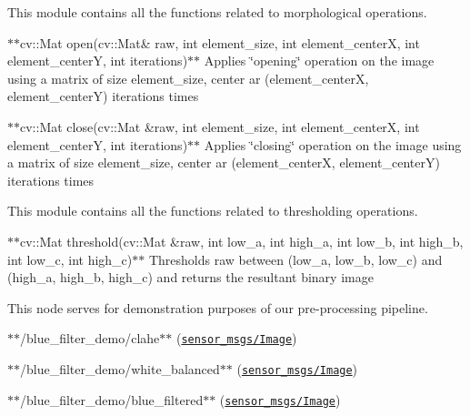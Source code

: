 This module contains all the functions related to morphological operations.


\begin{DoxyItemize}
\item $\ast$$\ast${\ttfamily cv\+::\+Mat open(cv\+::\+Mat\& raw, int element\+\_\+size, int element\+\_\+center\+X, int element\+\_\+center\+Y, int iterations)}$\ast$$\ast$ Applies \char`\"{}opening\char`\"{} operation on the image using a matrix of size {\ttfamily element\+\_\+size}, center ar ({\ttfamily element\+\_\+centerX}, {\ttfamily element\+\_\+centerY}) {\ttfamily iterations} times
\item $\ast$$\ast${\ttfamily cv\+::\+Mat close(cv\+::\+Mat \&raw, int element\+\_\+size, int element\+\_\+center\+X, int element\+\_\+center\+Y, int iterations)}$\ast$$\ast$ Applies \char`\"{}closing\char`\"{} operation on the image using a matrix of size {\ttfamily element\+\_\+size}, center ar ({\ttfamily element\+\_\+centerX}, {\ttfamily element\+\_\+centerY}) {\ttfamily iterations} times
\end{DoxyItemize}

This module contains all the functions related to thresholding operations.


\begin{DoxyItemize}
\item $\ast$$\ast${\ttfamily cv\+::\+Mat threshold(cv\+::\+Mat \&raw, int low\+\_\+a, int high\+\_\+a, int low\+\_\+b, int high\+\_\+b, int low\+\_\+c, int high\+\_\+c)}$\ast$$\ast$ Thresholds {\ttfamily raw} between ({\ttfamily low\+\_\+a}, {\ttfamily low\+\_\+b}, {\ttfamily low\+\_\+c}) and ({\ttfamily high\+\_\+a}, {\ttfamily high\+\_\+b}, {\ttfamily high\+\_\+c}) and returns the resultant binary image
\end{DoxyItemize}

This node serves for demonstration purposes of our pre-\/processing pipeline.


\begin{DoxyItemize}
\item $\ast$$\ast${\ttfamily /blue\+\_\+filter\+\_\+demo/clahe}$\ast$$\ast$ (\href{http://docs.ros.org/api/sensor_msgs/html/msg/Image.html}{\tt sensor\+\_\+msgs/\+Image})
\item $\ast$$\ast${\ttfamily /blue\+\_\+filter\+\_\+demo/white\+\_\+balanced}$\ast$$\ast$ (\href{http://docs.ros.org/api/sensor_msgs/html/msg/Image.html}{\tt sensor\+\_\+msgs/\+Image})
\item $\ast$$\ast${\ttfamily /blue\+\_\+filter\+\_\+demo/blue\+\_\+filtered}$\ast$$\ast$ (\href{http://docs.ros.org/api/sensor_msgs/html/msg/Image.html}{\tt sensor\+\_\+msgs/\+Image})
\end{DoxyItemize}


